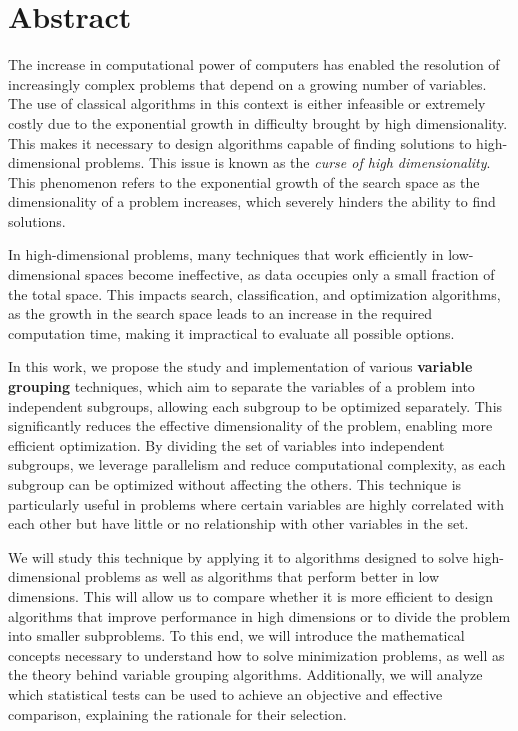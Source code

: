 %

\chapter{Abstract}

\indent The increase in computational power of computers has enabled the resolution of increasingly complex problems that depend on a growing number of variables. The use of classical algorithms in this context is either infeasible or extremely costly due to the exponential growth in difficulty brought by high dimensionality. This makes it necessary to design algorithms capable of finding solutions to high-dimensional problems. This issue is known as the \textit{curse of high dimensionality}. This phenomenon refers to the exponential growth of the search space as the dimensionality of a problem increases, which severely hinders the ability to find solutions.

In high-dimensional problems, many techniques that work efficiently in low-dimensional spaces become ineffective, as data occupies only a small fraction of the total space. This impacts search, classification, and optimization algorithms, as the growth in the search space leads to an increase in the required computation time, making it impractical to evaluate all possible options.

In this work, we propose the study and implementation of various \textbf{variable grouping} techniques, which aim to separate the variables of a problem into independent subgroups, allowing each subgroup to be optimized separately. This significantly reduces the effective dimensionality of the problem, enabling more efficient optimization. By dividing the set of variables into independent subgroups, we leverage parallelism and reduce computational complexity, as each subgroup can be optimized without affecting the others. This technique is particularly useful in problems where certain variables are highly correlated with each other but have little or no relationship with other variables in the set.

We will study this technique by applying it to algorithms designed to solve high-dimensional problems as well as algorithms that perform better in low dimensions. This will allow us to compare whether it is more efficient to design algorithms that improve performance in high dimensions or to divide the problem into smaller subproblems. To this end, we will introduce the mathematical concepts necessary to understand how to solve minimization problems, as well as the theory behind variable grouping algorithms. Additionally, we will analyze which statistical tests can be used to achieve an objective and effective comparison, explaining the rationale for their selection.

